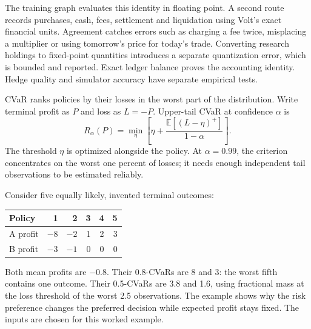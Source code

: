 \documentclass[8pt]{strategynet-journal}
\newcommand{\E}{\mathbb{E}}
\begin{document}
\begin{SNcolumns}
The training graph evaluates this identity in floating point. A second route
records purchases, cash, fees, settlement and liquidation using Volt's exact
financial units. Agreement catches errors such as charging a fee twice,
misplacing a multiplier or using tomorrow's price for today's trade.
Converting research holdings to fixed-point quantities introduces a separate
quantization error, which is bounded and reported. Exact ledger balance proves
the accounting identity. Hedge quality and simulator accuracy have separate
empirical tests.

CVaR ranks policies by their losses in the worst part of the distribution.
Write terminal profit as $P$ and loss as $L=-P$. Upper-tail CVaR at
confidence $\alpha$ is
\[
 R_\alpha(P)=\min_\eta\left[
 \eta+\frac{\E[(L-\eta)^+]}{1-\alpha}\right].
\]
The threshold $\eta$ is optimized alongside the policy. At $\alpha=0.99$,
the criterion concentrates on the worst one percent of losses; it needs enough
independent tail observations to be estimated reliably.

Consider five equally likely, invented terminal outcomes:
\begin{center}
\begin{tabular}{@{}lrrrrr@{}}
\toprule
Policy & 1 & 2 & 3 & 4 & 5\\
\midrule
A profit & $-8$ & $-2$ & 1 & 2 & 3\\
B profit & $-3$ & $-1$ & 0 & 0 & 0\\
\bottomrule
\end{tabular}
\end{center}
Both mean profits are $-0.8$. Their 0.8-CVaRs are 8 and 3: the worst fifth
contains one outcome. Their 0.5-CVaRs are 3.8 and 1.6, using fractional mass
at the loss threshold of the worst 2.5 observations. The example shows why the
risk preference changes the preferred decision while expected profit stays
fixed. The inputs are chosen for this worked example.


\end{SNcolumns}
\end{document}
